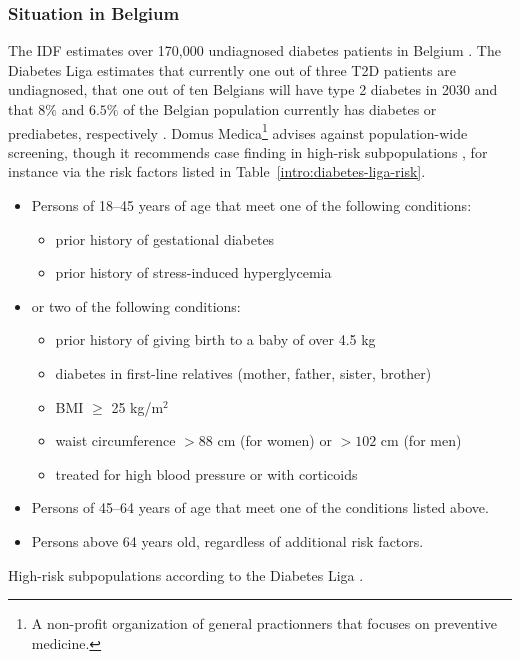 %
%


\subsubsection{Situation in Belgium} \label{intro:screening-belgium}
The IDF estimates over 170,000 undiagnosed diabetes patients in Belgium \citep{IDFatlas}. The Diabetes Liga estimates that currently one out of three T2D patients are undiagnosed, that one out of ten Belgians will have type 2 diabetes in 2030 and that $8\%$ and $6.5\%$ of the Belgian population currently has diabetes or prediabetes, respectively \citep{diabetesliga}. Domus Medica\footnote{A non-profit organization of general practionners that focuses on preventive medicine.} advises against population-wide screening, though it recommends case finding in high-risk subpopulations \citep{wens2005aanbeveling}, for instance via the risk factors listed in Table~\ref{intro:diabetes-liga-risk}.
\begin{table}[!h]
\colorbox{gray!20!white}{\parbox{\textwidth}{
\begin{itemize}
\item Persons of 18--45 years of age that meet one of the following conditions:
\begin{itemize}
\item prior history of gestational diabetes
\item prior history of stress-induced hyperglycemia
\end{itemize}
\item or two of the following conditions:
\begin{itemize}
\item prior history of giving birth to a baby of over 4.5 kg
\item diabetes in first-line relatives (mother, father, sister, brother)
\item BMI $\geq$ 25 kg/m$^2$
\item waist circumference $>88$ cm (for women) or $>102$ cm (for men)
\item treated for high blood pressure or with corticoids
\end{itemize}
\item Persons of 45--64 years of age that meet one of the conditions listed above.
\item Persons above 64 years old, regardless of additional risk factors.
\end{itemize}
}}
\caption{High-risk subpopulations according to the Diabetes Liga \citep{diabetesliga}.} \label{intro:diabetes-liga-risk}
\end{table}

